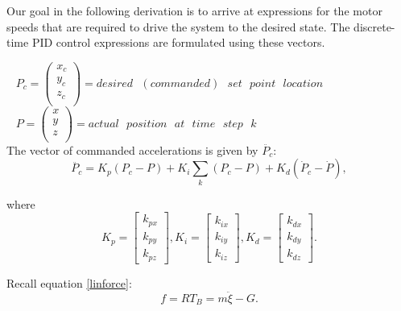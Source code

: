 Our goal in the following derivation is to arrive at expressions for the motor speeds that are required to drive the system to the desired state. The discrete-time PID control expressions are formulated using these vectors.

\mbox{ } \hspace{0.5in} $P_c = \left( \begin{array}{c}
x_c\\y_c\\z_c\\
\end{array}\right) = desired\text{ } (commanded)\text{ }set\text{ }point\text{ }location $\\

\mbox{ } \hspace{0.5in} $P = \left( \begin{array}{c}
x\\y\\z\\
\end{array}\right) = actual \text{ }position\text{ }at\text{ }time\text{ }step\text{ }k$\\

The vector of commanded accelerations is given by $\ddot{P_c}$:
\begin{equation}
    \label{eq:acc_comm}
    \ddot{P_c} = K_p(P_c - P) + K_i \sum_k (P_c-P) + K_d(\dot{P}_c - \dot{P}),
\end{equation}

where
\begin{equation}
 K_p = \left[ \begin{array}{c} k_{px} \\ k_{py} \\ k_{pz}  \end{array} \right] , K_i = \left[ \begin{array}{c} k_{ix} \\ k_{iy} \\ k_{iz}  \end{array} \right], K_d = \left[ \begin{array}{c} k_{dx} \\ k_{dy} \\ k_{dz}  \end{array} \right] .
\end{equation}

Recall equation \ref{linforce}:
\begin{equation}
    f =  R  T_B = m \ddot{ \xi} -  G.
\end{equation}

